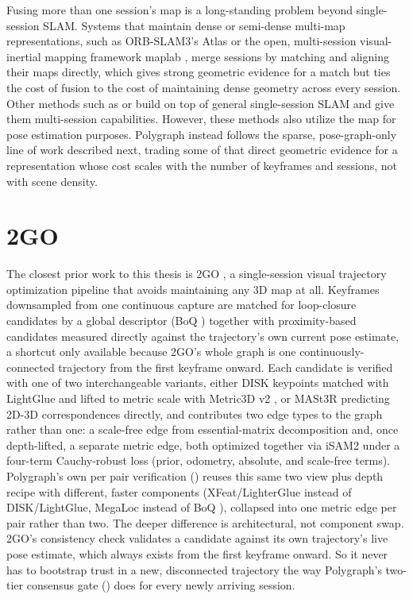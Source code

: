 Fusing more than one session's map is a long-standing problem beyond single-session SLAM. Systems that maintain dense or semi-dense multi-map representations, such as ORB-SLAM3's Atlas \cite{elvira2019orbslamatlasrobustaccuratemultimap} or the open, multi-session visual-inertial mapping framework maplab \cite{schneider2018maplab}, merge sessions by matching and aligning their maps directly, which gives strong geometric evidence for a match but ties the cost of fusion to the cost of maintaining dense geometry across every session. Other methods such as \cite{covins} or \cite{covins-g} build on top of general single-session SLAM and give them multi-session capabilities. However, these methods also utilize the map for pose estimation purposes. Polygraph instead follows the sparse, pose-graph-only line of work described next, trading some of that direct  geometric evidence for a representation whose cost scales with the number of keyframes and sessions, not with scene density.

\section{2GO}
\label{sec:relatedwork-2go}

The closest prior work to this thesis is 2GO \cite{lim2025twogo}, a single-session visual trajectory optimization pipeline that avoids maintaining any 3D map at all. Keyframes downsampled from one continuous capture are matched for loop-closure candidates by a global descriptor (BoQ \cite{alibey2024boq}) together with proximity-based candidates measured directly against the trajectory's own current pose estimate, a shortcut only available because 2GO's whole graph is one continuously-connected trajectory from the first keyframe onward. Each candidate is verified with one of two interchangeable variants, either DISK keypoints \cite{tyszkiewicz2020disk} matched with LightGlue \cite{lindenberger2023lightglue} and lifted to metric scale with Metric3D v2 \cite{hu2024metric3dv2}, or MASt3R \cite{leroy2024mast3r} predicting 2D-3D correspondences directly, and contributes two edge types to the graph rather than one: a scale-free edge from essential-matrix decomposition and, once depth-lifted, a separate metric edge, both optimized together via iSAM2 \cite{kaess2012isam2} under a four-term Cauchy-robust loss (prior, odometry, absolute, and scale-free terms). Polygraph's own per pair verification () reuses this same two view plus depth recipe with different, faster components (XFeat/LighterGlue \cite{lindenberger2023lightglue} instead of DISK/LightGlue, MegaLoc \cite{berton2025megaloc} instead of BoQ \cite{alibey2024boq}), collapsed into one metric edge per pair rather than two. The deeper difference is architectural, not component swap. 2GO's consistency check validates a candidate against its own trajectory's live pose estimate, which always exists from the first keyframe onward. So it never has to bootstrap trust in a new, disconnected trajectory the way Polygraph's two-tier consensus gate () does for every newly arriving session.

